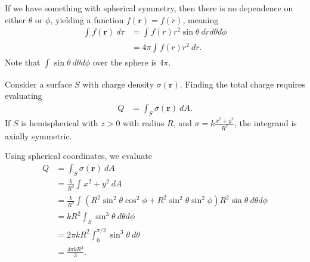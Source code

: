 \documentclass[10pt]{mypackage}
\begin{document}
If we have something with spherical symmetry, then there is no dependence on either $\theta$ or $\phi$, yielding a function $f\left(\mathbf{r}\right) = f(r)$, meaning
\begin{align*}
  \int_{}^{} f\left(\mathbf{r}\right)\:d\tau &= \int_{}^{} f(r)r^2\sin\theta\:drd\theta d\phi\\
                                             &= 4\pi \int_{}^{} f(r)r^2\:dr.
\end{align*}
Note that $\int_{}^{} \sin\theta \:d\theta d\phi$ over the sphere is $4\pi$.
\begin{example}
  Consider a surface $S$ with charge density $\sigma\left(\mathbf{r}\right)$. Finding the total charge requires evaluating
  \begin{align*}
    Q &= \int_{S}^{} \sigma\left(\mathbf{r}\right)\:dA.
  \end{align*}
  If $S$ is hemispherical with $z > 0$ with radius $R$, and $\sigma = k\frac{x^2 + y^2}{R^2}$, the integrand is axially symmetric.\newline

  Using spherical coordinates, we evaluate
  \begin{align*}
    Q &= \int_{S}^{} \sigma\left(\mathbf{r}\right)\:dA\\
      &= \frac{k}{R^2}\int_{}^{} x^2 + y^2\:dA\\
      &= \frac{k}{R^2}\int_{}^{} \left(R^2\sin^2\theta\cos^2\phi + R^2\sin^2\theta\sin^2\phi\right)R^2\sin\theta\:d\theta d\phi\\
      &= kR^2\int_{S}^{} \sin^{3}\theta\:d\theta d\phi\\
      &= 2\pi kR^2 \int_{0}^{\pi/2} \sin^{3}\theta\:d\theta\\
      &= \frac{4\pi kR^2}{3}.
  \end{align*}
\end{example}
\end{document}
